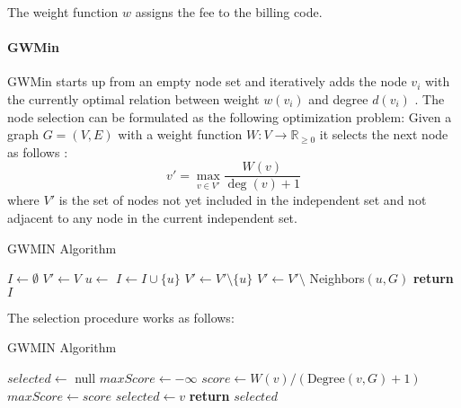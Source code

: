 The weight function $w$ assigns the fee to the billing code.




\paragraph{GWMin}
GWMin starts up from an empty node set
and iteratively adds the node $v_i$ with the currently optimal relation between weight $w(v_i)$ and degree $d(v_i)$ \cite{SAKAI2003313}.
The node selection can be formulated as the following optimization problem:
Given a graph $G = (V, E)$ with a weight function $W: V \to \mathbb{R}_{\geq 0}$ it selects the next node as follows :
\[
    v' = \max_{v \in V'} \frac{W(v)}{\deg(v) + 1}
\]
where $V'$ is the set of nodes not yet included in the independent set and not adjacent to any node in the current independent set.


\begin{algorithm}
    \caption{GWMIN Algorithm}
    \begin{algorithmic}[1]
            \State $I \gets \emptyset$ 
            \State $V' \gets V$ 
                \State $u \gets$ 
                \State $I \gets I \cup \{u\}$ 
                \State $V' \gets V' \setminus \{u\}$ 
                \State $V' \gets V' \setminus$ Neighbors$(u, G)$ 
            \EndWhile
            \State \textbf{return} $I$
        \EndProcedure
    \end{algorithmic}\label{alg:algorithm-gwmin}
\end{algorithm}

The selection procedure works as follows:

\begin{algorithm}
    \caption{GWMIN Algorithm}
    \begin{algorithmic}[1]
            \State $selected \gets$ null
            \State $maxScore \gets -\infty$
                \State $score \gets W(v) / (\text{Degree}(v, G) + 1)$
                    \State $maxScore \gets score$
                    \State $selected \gets v$
                \EndIf
            \EndFor
            \State \textbf{return} $selected$
        \EndProcedure
    \end{algorithmic}\label{alg:algorithm-gwin-selection}
\end{algorithm}


